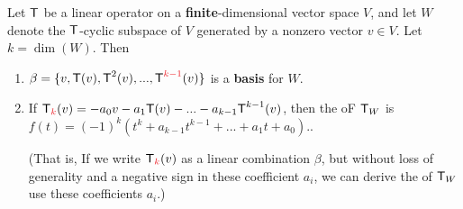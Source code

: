\begin{theorem} \label{thm 5.21}
Let \(\textsf{T}\) be a linear operator on a \textbf{finite}-dimensional vector space \(V\), and let \(W\) denote the \(\textsf{T}\)-cyclic subspace of \(V\) generated by a nonzero vector \(v \in V\).
Let \(k = \dim(W)\).
Then
\begin{enumerate}
\item \(\beta = \{ v, \T(v), \T^2(v), ..., \T^{\RED{k - 1}}(v) \}\) is a \textbf{basis} for \(W\).
\item If \(\T_{\RED{k}}(v) = -a_0 v - a_1 \T(v) - ... - a_{k - 1} \T^{k - 1}(v) \), then the \CPOLY{} oF \(\textsf{T}_W\) is \(f(t) = (-1)^k (t^k + a_{k - 1} t^{k-1} + ... + a_1 t + a_0).\).

(That is, If we write \(\T_{\RED{k}}(v)\) as a linear combination \(\beta\), but without loss of generality and a negative sign in these coefficient \(a_i\), we can derive the \CPOLY{} of \(\textsf{T}_W\) use these coefficients \(a_i\).)
\end{enumerate}
\end{theorem}

